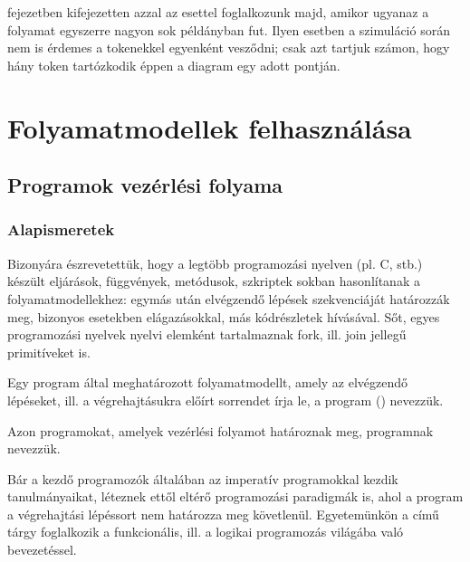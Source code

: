  fejezetben kifejezetten azzal az esettel foglalkozunk majd, amikor ugyanaz a folyamat egyszerre nagyon sok példányban fut. Ilyen esetben a szimuláció során nem is érdemes a tokenekkel egyenként vesződni; csak azt tartjuk számon, hogy hány token tartózkodik éppen a diagram egy adott pontján.






\section{Folyamatmodellek felhasználása}

\subsection{Programok vezérlési folyama}

\subsubsection{Alapismeretek}
Bizonyára észrevetettük, hogy a legtöbb programozási nyelven (pl. C, \cpp stb.) készült eljárások, függvények, metódusok, szkriptek sokban hasonlítanak a folyamatmodellekhez: egymás után elvégzendő lépések szekvenciáját határozzák meg, bizonyos esetekben elágazásokkal, más kódrészletek hívásával. Sőt, egyes programozási nyelvek nyelvi elemként tartalmaznak fork, ill. join jellegű primitíveket is.  

\begin{definicio}
Egy program által meghatározott folyamatmodellt, amely az elvégzendő lépéseket, ill. a végrehajtásukra előírt sorrendet írja le, a program  () nevezzük. 
\end{definicio}

\begin{definicio}
Azon programokat, amelyek vezérlési folyamot határoznak meg,  programnak nevezzük.  
\end{definicio}

\begin{megjegyzes}
	Bár a kezdő programozók általában az imperatív programokkal kezdik tanulmányaikat, léteznek ettől eltérő programozási paradigmák is, ahol a program a végrehajtási lépéssort nem határozza meg követlenül. Egyetemünkön a \deklapo című tárgy foglalkozik a funkcionális, ill. a logikai programozás világába való bevezetéssel.
\end{megjegyzes}


